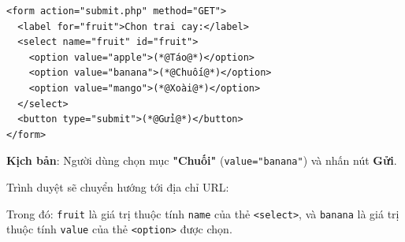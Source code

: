 \documentclass[11pt,oneside]{book}
\newcommand{\codeinline}[1]{\textcolor{accentOrange}{\texttt{#1}}}
\begin{document}
\begin{codeWindow}
\begin{lstlisting}[language=HTML5]
<form action="submit.php" method="GET">
  <label for="fruit">Chon trai cay:</label>
  <select name="fruit" id="fruit">
    <option value="apple">(*@Táo@*)</option>
    <option value="banana">(*@Chuối@*)</option>
    <option value="mango">(*@Xoài@*)</option>
  </select>
  <button type="submit">(*@Gửi@*)</button>
</form>
\end{lstlisting}
\end{codeWindow}

\begin{tipBox}
\textbf{Kịch bản}: Người dùng chọn mục \textbf{"Chuối"} (\codeinline{value="banana"}) và nhấn nút \textbf{Gửi}.
\par\vspace{4pt}
Trình duyệt sẽ chuyển hướng tới địa chỉ URL:
\begin{center}
\end{center}
Trong đó: \codeinline{fruit} là giá trị thuộc tính \codeinline{name} của thẻ \codeinline{<select>}, và \codeinline{banana} là giá trị thuộc tính \codeinline{value} của thẻ \codeinline{<option>} được chọn.
\end{tipBox}
\end{document}
